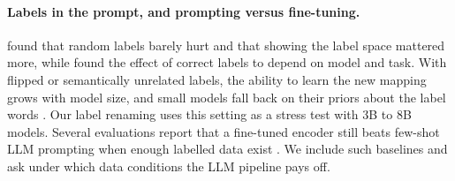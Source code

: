 \paragraph{Labels in the prompt, and prompting versus fine-tuning.}
\citet{min2022rethinking} found that random labels barely hurt and that showing the label space mattered more, while \citet{yoo2022groundtruth} found the effect of correct labels to depend on model and task.
With flipped or semantically unrelated labels, the ability to learn the new mapping grows with model size, and small models fall back on their priors about the label words \citep{wei2023larger,pan2023what,kossen2024incontext}.
Our label renaming uses this setting as a stress test with 3B to 8B models.
Several evaluations report that a fine-tuned encoder still beats few-shot LLM prompting when enough labelled data exist \citep{edwards2024language,bucher2024fine,yu2023open,sun2023text}.
We include such baselines and ask under which data conditions the LLM pipeline pays off.
